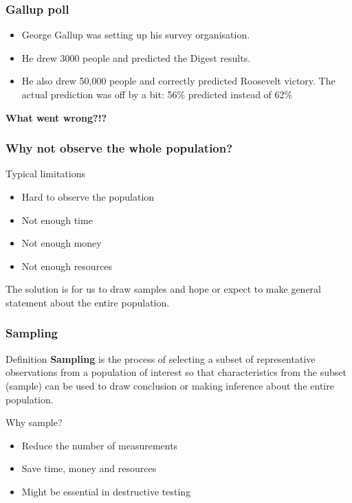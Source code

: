 \documentclass[a4paper]{article}
\begin{document}
\subsubsection{Gallup poll}
\begin{itemize}
    \item George Gallup was setting up his survey organisation.
    \item He drew 3000 people and predicted the Digest results.
    \item He also drew 50,000 people and correctly predicted Roosevelt victory. The actual prediction was off by a bit: 56\% predicted instead of 62\%
\end{itemize}
\begin{greenbox}
	\textbf{What went wrong?!?}
\end{greenbox}
\subsubsection{Why not observe the whole population?}
\begin{bluebox}{Typical limitations}
\begin{itemize}
    \item Hard to observe the population
    \item Not enough time
    \item Not enough money
    \item Not enough resources
\end{itemize}
\end{bluebox}
The solution is for us to draw samples and hope or expect to make general statement about the entire population.
\subsubsection{Sampling}
\begin{bluebox}{Definition}
    \textbf{Sampling} is the process of selecting a subset of representative observations from a population of interest so that characteristics from the subset (sample) can be used to draw conclusion or making inference about the entire population.
\end{bluebox}
Why sample?
\begin{itemize}
    \item Reduce the number of measurements
    \item Save time, money and resources
    \item Might be essential in destructive testing
\end{itemize}
\end{document}
